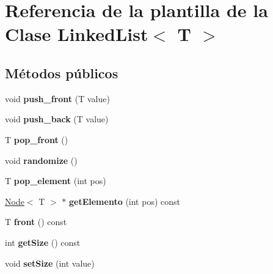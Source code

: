 \hypertarget{classLinkedList}{}\section{Referencia de la plantilla de la Clase Linked\+List$<$ T $>$}
\label{classLinkedList}
\subsection*{Métodos públicos}
\begin{DoxyCompactItemize}
\item 
\mbox{\label{classLinkedList_a0bba78cfa14366ce141398b03ff92026}} 
void {\bfseries push\+\_\+front} (T value)
\item 
\mbox{\label{classLinkedList_a7b6879123bed974c8c2271f1b28e170f}} 
void {\bfseries push\+\_\+back} (T value)
\item 
\mbox{\label{classLinkedList_ab6fd7591d9daeaf07e18c9c0045f9d1f}} 
T {\bfseries pop\+\_\+front} ()
\item 
\mbox{\label{classLinkedList_a94aa9b5933b9d83f31cb795527bea073}} 
void {\bfseries randomize} ()
\item 
\mbox{\label{classLinkedList_a06b964382eea9deb7ff2129e2ffd4632}} 
T {\bfseries pop\+\_\+element} (int pos)
\item 
\mbox{\label{classLinkedList_aadc33c52885f85518379c2f7863369cb}} 
\hyperlink{classNode}{Node}$<$ T $>$ $\ast$ {\bfseries get\+Elemento} (int pos) const
\item 
\mbox{\label{classLinkedList_aa01a1c361d5998278c8ddff8460837aa}} 
T {\bfseries front} () const
\item 
\mbox{\label{classLinkedList_a2b77410d908509ee9f11497ead71a282}} 
int {\bfseries get\+Size} () const
\item 
\mbox{\label{classLinkedList_a7365387a2d9a59088130bc6a1b072406}} 
void {\bfseries set\+Size} (int value)
\item 

\end{DoxyCompactItemize}
